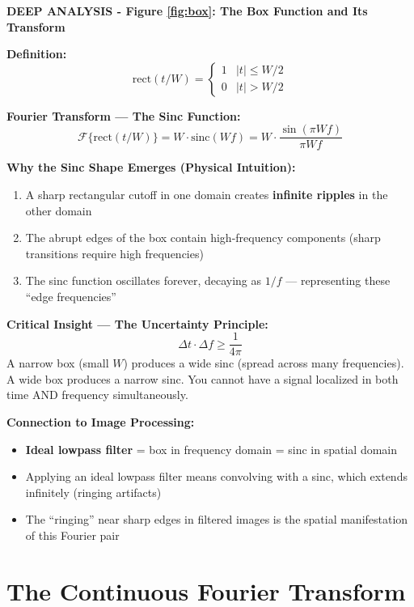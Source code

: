 \documentclass[12pt,a4paper]{article}
\begin{document}
\begin{deepexplanation}
\textbf{DEEP ANALYSIS - Figure \ref{fig:box}: The Box Function and Its Transform}

\textbf{Definition:}
\[
\text{rect}(t/W) = \begin{cases} 1 & |t| \leq W/2 \\ 0 & |t| > W/2 \end{cases}
\]

\textbf{Fourier Transform --- The Sinc Function:}
\[
\mathcal{F}\{\text{rect}(t/W)\} = W \cdot \text{sinc}(Wf) = W \cdot \frac{\sin(\pi W f)}{\pi W f}
\]

\textbf{Why the Sinc Shape Emerges (Physical Intuition):}
\begin{enumerate}
    \item A sharp rectangular cutoff in one domain creates \textbf{infinite ripples} in the other domain
    \item The abrupt edges of the box contain high-frequency components (sharp transitions require high frequencies)
    \item The sinc function oscillates forever, decaying as $1/f$ --- representing these ``edge frequencies''
\end{enumerate}

\textbf{Critical Insight --- The Uncertainty Principle:}
\[
\Delta t \cdot \Delta f \geq \frac{1}{4\pi}
\]
A narrow box (small $W$) produces a wide sinc (spread across many frequencies). A wide box produces a narrow sinc. You cannot have a signal localized in both time AND frequency simultaneously.

\textbf{Connection to Image Processing:}
\begin{itemize}
    \item \textbf{Ideal lowpass filter} = box in frequency domain = sinc in spatial domain
    \item Applying an ideal lowpass filter means convolving with a sinc, which extends infinitely (ringing artifacts)
    \item The ``ringing'' near sharp edges in filtered images is the spatial manifestation of this Fourier pair
\end{itemize}
\end{deepexplanation}

\section{The Continuous Fourier Transform}
\end{document}
